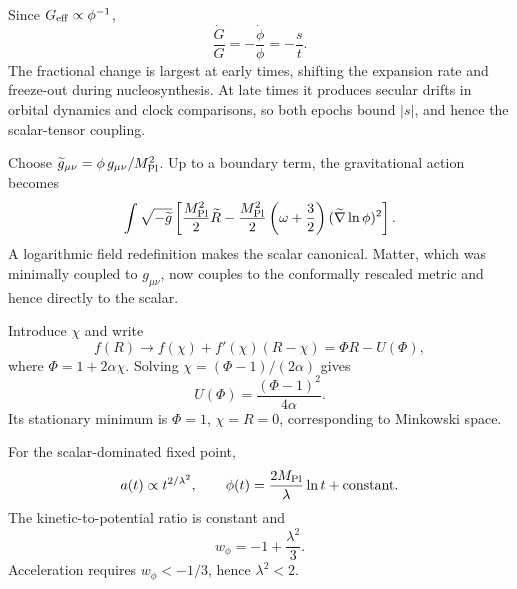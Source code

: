 \begin{solutions}
\begin{solution}
Since \(G_{\rm eff}\propto\phi^{-1}\),
\[
\frac{\dot G}{G}=-\frac{\dot\phi}{\phi}=-\frac{s}{t}.
\]
The fractional change is largest at early times, shifting the expansion rate
and freeze-out during nucleosynthesis.  At late times it produces secular
drifts in orbital dynamics and clock comparisons, so both epochs bound
\(|s|\), and hence the scalar-tensor coupling.
\end{solution}

\begin{solution}
Choose
\(\widetilde g_{\mu\nu}=\phi\,g_{\mu\nu}/M_{\rm Pl}^2\).  Up to a boundary
term, the gravitational action becomes
\[
\int\sqrt{-\widetilde g}\left[
\frac{M_{\rm Pl}^2}{2}\widetilde R
-\frac{M_{\rm Pl}^2}{2}
\left(\omega+\frac32\right)(\widetilde\nabla\ln\phi)^2\right].
\]
A logarithmic field redefinition makes the scalar canonical.  Matter, which
was minimally coupled to \(g_{\mu\nu}\), now couples to the conformally
rescaled metric and hence directly to the scalar.
\end{solution}

\begin{solution}
Introduce \(\chi\) and write
\[
f(R)\longrightarrow f(\chi)+f'(\chi)(R-\chi)
=\Phi R-U(\Phi),
\]
where \(\Phi=1+2\alpha\chi\).  Solving
\(\chi=(\Phi-1)/(2\alpha)\) gives
\[
U(\Phi)=\frac{(\Phi-1)^2}{4\alpha}.
\]
Its stationary minimum is \(\Phi=1\), \(\chi=R=0\), corresponding to
Minkowski space.
\end{solution}

\begin{solution}
For the scalar-dominated fixed point,
\[
a(t)\propto t^{2/\lambda^2},\qquad
\phi(t)=\frac{2M_{\rm Pl}}{\lambda}\ln t+\text{constant}.
\]
The kinetic-to-potential ratio is constant and
\[
w_\phi=-1+\frac{\lambda^2}{3}.
\]
Acceleration requires \(w_\phi<-1/3\), hence \(\lambda^2<2\).
\end{solution}



\end{solutions}

